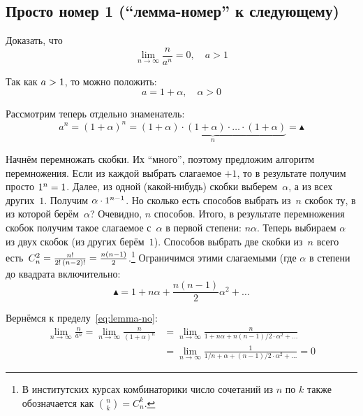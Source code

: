 \documentclass[a4paper,12pt]{article}
\begin{document}
  
  \subsection{Просто номер 1 (``лемма-номер'' к следующему)}\label{sec:simple-no-1}
  
  Доказать, что
  \begin{equation}\label{eq:lemma-no}
    \lim_{n \to \infty} \frac{n}{a^n} = 0,\quad a > 1
  \end{equation}
  
  \begin{solution}
    Так как $a \hm> 1$, то можно положить:
    \[
      a = 1 + \alpha,\quad \alpha > 0
    \]
    
    Рассмотрим теперь отдельно знаменатель:
    \[
      a^n = (1 + \alpha)^n = \underbrace{(1 + \alpha) \cdot (1 + \alpha) \cdot \ldots \cdot (1 + \alpha)}_{n} = \blacktriangle
    \]
    
    Начнём перемножать скобки.
    Их ``много'', поэтому предложим алгоритм перемножения.
    Если из каждой выбрать слагаемое ${+}1$, то в результате получим просто $1^n \hm= 1$.
    Далее, из одной (какой-нибудь) скобки выберем~$\alpha$, а из всех других~$1$.
    Получим $\alpha \hm\cdot 1^{n - 1}$.
    Но сколько есть способов выбрать из~$n$ скобок ту, в из которой берём~$\alpha$?
    Очевидно, $n$ способов.
    Итого, в результате перемножения скобок получим такое слагаемое с~$\alpha$ в первой степени: $n \alpha$.
    Теперь выбираем $\alpha$ из двух скобок (из других берём~$1$).
    Способов выбрать две скобки из~$n$ всего есть~$C_n^2 \hm= \frac{n!}{2!\,(n - 2)!} \hm= \frac{n(n - 1)}{2}$.\footnote{
      В институтских курсах комбинаторики число сочетаний из $n$ по $k$ также обозначается как $\binom{n}{k} = C_n^k$.
    }
    Ограничимся этими слагаемыми (где $\alpha$ в степени до квадрата включительно:
    \[
      \blacktriangle = 1 + n \alpha + \frac{n(n - 1)}{2} \alpha^2 + \ldots
    \]
    
    Вернёмся к пределу~\eqref{eq:lemma-no}:
    \begin{equation*}
    \begin{split}
      \lim_{n \to \infty} \frac{n}{a^n}
        = \lim_{n \to \infty} \frac{n}{(1 + \alpha)^n}
        &= \lim_{n \to \infty} \frac{n}{1 + n \alpha + n(n - 1)/2 \cdot \alpha^2 + \ldots}\\
        &= \lim_{n \to \infty} \frac{1}{1/n + \alpha + (n - 1)/2 \cdot \alpha^2 + \ldots}
        = 0
    \end{split}
    \end{equation*}
  \end{solution}
  
\end{document}
